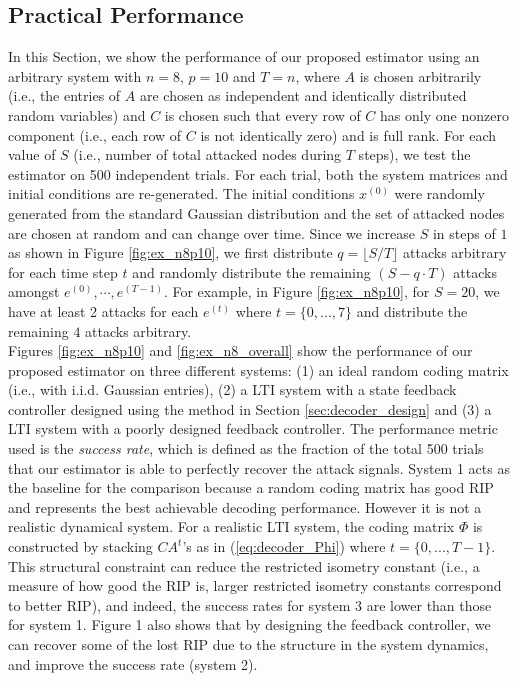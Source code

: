 \documentclass[twocolumn]{autart}    %
\newcommand{\rev}[1]{{\normalsize{{{\color{blue}#1}}}}}
\newcommand{\qie}[1]{{\normalsize{{{\color{magenta}#1}}}}}
\begin{document}
\subsection{Practical Performance}\label{sec:prac_perf}
\vspace{-0.4cm}
In this Section, we show the performance of our proposed \rev{estimator} using an arbitrary system with $n=8$, $p=10$ and $T=n$, where $A$ is chosen arbitrarily (i.e., the entries of $A$ are chosen as independent and identically distributed random variables) and $C$ is chosen such that every row of $C$ has only one nonzero component (i.e., each row of $C$ is not identically zero) and is full rank. 
For each value of $S$ (i.e., number of total attacked nodes during $T$ steps), we test the \rev{estimator} on 500 independent trials. For each trial, both the system matrices and initial conditions are re-generated. The initial conditions $x^{(0)}$ were randomly generated from the standard Gaussian distribution and the set of attacked nodes are chosen at random and can change over time. Since we increase $S$ in steps of $1$ as shown in Figure \ref{fig:ex_n8p10}, %
we first distribute $q= \lfloor S/T \rfloor$ attacks arbitrary for each time step $t$ and randomly distribute the remaining $(S-q\cdot T)$ attacks amongst $e^{(0)},\cdots, e^{(T-1)}$. For example, in Figure \ref{fig:ex_n8p10}, for $S=20$, we have at least 2 attacks for each $e^{(t)}$ where $t=\{0,...,7\}$ and distribute the remaining $4$ attacks arbitrary. 
\\
Figures \ref{fig:ex_n8p10} and \ref{fig:ex_n8_overall} show the performance of our proposed \rev{estimator} on three different systems: (1) an ideal random coding matrix (i.e., with i.i.d. Gaussian entries), (2) a LTI system with a state feedback controller designed using the method in Section \ref{sec:decoder_design} and (3) a LTI system with a poorly designed feedback controller. 
The performance metric used is the \textit{success rate}, which is defined as the fraction of the total 500 trials that our \rev{estimator} is able to perfectly recover the attack signals.
System 1 acts as the baseline for the comparison because a random coding matrix has good RIP and represents the best achievable decoding performance. However it is not a realistic dynamical system. For a realistic LTI system, the coding matrix $\Phi$ is constructed by stacking $CA^{t}$'s as in (\ref{eq:decoder_Phi}) where $t=\{ 0, ..., T-1\}$. This structural constraint can reduce the restricted isometry constant (i.e., a measure of how good the RIP is, larger restricted isometry constants correspond to better RIP), and indeed, the success rates for system 3 are lower than those for system 1. Figure 1 also shows that by designing the feedback controller, we can recover some of the lost RIP due to the structure in the system dynamics, and improve the success rate (system 2).
\end{document}
